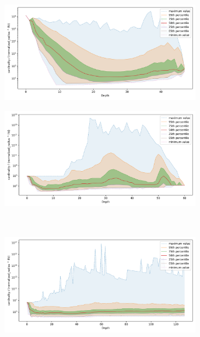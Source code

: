 \documentclass{article}
\begin{document}
\begin{figure}[ht!]
    \begin{subfigure}[b]{0.47\textwidth}
    \includegraphics[width=0.95\textwidth]{images/fractal_density/sift-1000000.png}\\
    \label{fig:results:sift-fractal_density}
    \end{subfigure}%
    \begin{subfigure}[b]{0.47\textwidth}
    \includegraphics[width=0.95\textwidth]{images/fractal_density/radio-ml-97920.png}\\
    \label{fig:results:radioml-fractal_density}
    \end{subfigure}%
    \\
    \begin{subfigure}[b]{0.47\textwidth}
    \includegraphics[width=0.95\textwidth]{images/fractal_density/silva-2224640.png}\\

\end{subfigure}
\end{figure}
\end{document}
